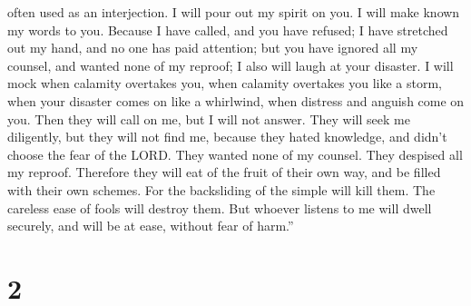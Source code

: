 often used as an interjection. I will pour out my spirit on you. I will
make known my words to you.  Because I have called, and you
have refused; I have stretched out my hand, and no one has paid
attention;  but you have ignored all my counsel, and wanted
none of my reproof;  I also will laugh at your disaster. I
will mock when calamity overtakes you,  when calamity
overtakes you like a storm, when your disaster comes on like a
whirlwind, when distress and anguish come on you.  Then
they will call on me, but I will not answer. They will seek me
diligently, but they will not find me,  because they hated
knowledge, and didn't choose the fear of the LORD.  They
wanted none of my counsel. They despised all my reproof. 
Therefore they will eat of the fruit of their own way, and be filled
with their own schemes.  For the backsliding of the simple
will kill them. The careless ease of fools will destroy them.
 But whoever listens to me will dwell securely, and will be
at ease, without fear of harm.''

\hypertarget{section-1}{%
\section{2}\label{section-1}}

